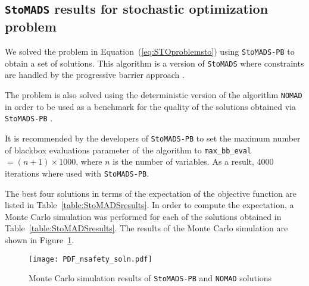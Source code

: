 \subsection{\texttt{StoMADS} results for stochastic optimization problem} \label{subsec:STOMADSresults}

We solved the problem in Equation~(\ref{eq:STOproblemsto}) using \texttt{StoMADS-PB} to obtain a set of solutions. This algorithm is a version of \texttt{StoMADS} where constraints are handled by the progressive barrier approach \cite{Audet2009}.

The problem is also solved using the deterministic version of the algorithm \texttt{NOMAD} in order to be used as a benchmark for the quality of the solutions obtained via \texttt{StoMADS-PB} \cite{LeDigabel2011}. 

It is recommended by the developers of \texttt{StoMADS-PB} to set the maximum number of blackbox evaluations parameter of the algorithm to \texttt{max\_bb\_eval}$ = (n+1) \times 1000$, where $n$ is the number of variables. As a result, 4000 iterations where used with \texttt{StoMADS-PB}.

The best four solutions in terms of the expectation of the objective function are listed in Table~\ref{table:StoMADSresults}. In order to compute the expectation, a Monte Carlo simulation was performed for each of the solutions obtained in Table~\ref{table:StoMADSresults}. The results of the Monte Carlo simulation are shown in Figure~\ref{fig:MCSstomadsresults}.

\begin{figure}[h!]
	\centering
	\texttt{[image: PDF\_nsafety\_soln.pdf]}
	\caption{Monte Carlo simulation results of \texttt{StoMADS-PB} and \texttt{NOMAD} solutions}
	\label{fig:MCSstomadsresults}
\end{figure}

\renewcommand{\ocwa}{1.5cm} %
\renewcommand{\ocwb}{1.85cm} %
\renewcommand{\ocwc}{1.85cm} %
\renewcommand{\ocwd}{1.85cm} %
\renewcommand{\ocwe}{1.85cm} %
\newcommand{\ocwf}{1.85cm} %
\newcommand{\ocwg}{1.85cm} %

